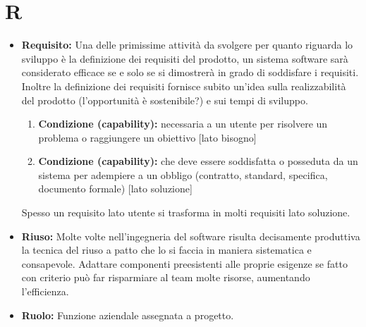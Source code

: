 \documentclass[a4paper]{article}
\begin{document}
	\section{R}
		\begin{itemize}
			\item \textbf{Requisito:}  Una delle primissime attività da svolgere per quanto riguarda lo sviluppo è la 
			definizione dei requisiti del prodotto, un sistema software sarà considerato efficace se e solo se si dimostrerà 
			in grado di soddisfare i requisiti. Inoltre la definizione dei requisiti fornisce subito un’idea sulla realizzabilità 
			del prodotto (l'opportunità è sostenibile?) e sui tempi di sviluppo.
			\begin{enumerate}
				\item \textbf{Condizione (capability):} necessaria a un utente per risolvere un problema o raggiungere un obiettivo [lato bisogno]
				\item \textbf{Condizione (capability):} che deve essere soddisfatta o posseduta da un sistema per adempiere a un obbligo (contratto, 
			  standard, specifica, documento formale) [lato soluzione]
			\end{enumerate}
			Spesso un requisito lato utente si trasforma in molti requisiti lato soluzione.
			\item \textbf{Riuso:} Molte volte nell'ingegneria del software risulta decisamente produttiva la tecnica del riuso a patto che lo si faccia 
			in maniera sistematica e consapevole. Adattare componenti preesistenti alle proprie esigenze se fatto con criterio può far 
			risparmiare al team molte risorse, aumentando l'efficienza.
			\item \textbf{Ruolo:} Funzione aziendale assegnata a progetto.
		\end{itemize}
		
\end{document}
